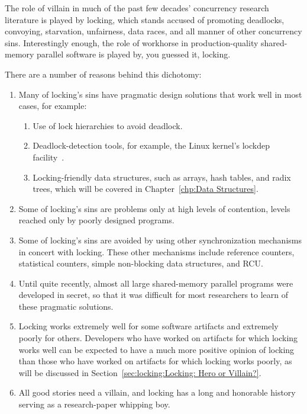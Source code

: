 

The role of villain in much of the past few decades' concurrency research
literature is played by locking,
which stands accused of promoting deadlocks, convoying, starvation,
unfairness, data races, and all manner of other concurrency sins.
Interestingly enough, the role of workhorse in production-quality
shared-memory parallel software is played by, you guessed it, locking.

There are a number of reasons behind this dichotomy:

\begin{enumerate}
\item	Many of locking's sins have pragmatic design solutions that
	work well in most cases, for example:
	\begin{enumerate}
	\item	Use of lock hierarchies to avoid deadlock.
	\item	Deadlock-detection tools, for example, the Linux kernel's
		lockdep facility~\cite{JonathanCorbet2006lockdep}.
	\item	Locking-friendly data structures, such as
		arrays, hash tables, and radix trees, which will
		be covered in Chapter~\ref{chp:Data Structures}.
	\end{enumerate}
\item	Some of locking's sins are problems only at high levels of
	contention, levels reached only by poorly designed programs.
\item	Some of locking's sins are avoided by using other synchronization
	mechanisms in concert with locking.
	These other mechanisms include reference counters,
	statistical counters, simple non-blocking data structures, and RCU.
\item	Until quite recently, almost all large shared-memory parallel
	programs were developed in secret, so that it was difficult for
	most researchers to learn of these pragmatic solutions.
\item	Locking works extremely well for some software artifacts
	and extremely poorly for others.
	Developers who have worked on artifacts for which locking
	works well can be expected to have a much more positive
	opinion of locking than those who have worked on artifacts
	for which locking works poorly, as will be discussed in
	Section~\ref{sec:locking:Locking: Hero or Villain?}.
\item	All good stories need a villain, and locking has a long and
	honorable history serving as a research-paper whipping boy.
\end{enumerate}

